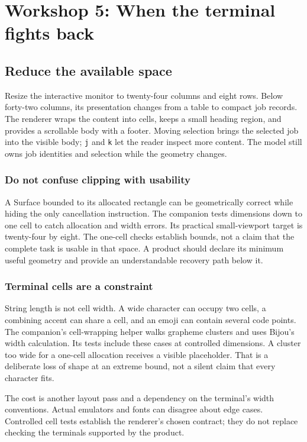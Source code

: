 \chapter{Workshop 5: When the terminal fights back}\label{workshop-05}

\section{Reduce the available space}

Resize the interactive monitor to twenty-four columns and eight rows. Below forty-two columns, its presentation changes from a table to compact job records. The renderer wraps the content into cells, keeps a small heading region, and provides a scrollable body with a footer. Moving selection brings the selected job into the visible body; \texttt{j} and \texttt{k} let the reader inspect more content. The model still owns job identities and selection while the geometry changes.

\subsection{Do not confuse clipping with usability}

A Surface bounded to its allocated rectangle can be geometrically correct while hiding the only cancellation instruction. The companion tests dimensions down to one cell to catch allocation and width errors. Its practical small-viewport target is twenty-four by eight. The one-cell checks establish bounds, not a claim that the complete task is usable in that space. A product should declare its minimum useful geometry and provide an understandable recovery path below it.

\subsection{Terminal cells are a constraint}

String length is not cell width. A wide character can occupy two cells, a combining accent can share a cell, and an emoji can contain several code points. The companion's cell-wrapping helper walks grapheme clusters and uses Bijou's width calculation. Its tests include these cases at controlled dimensions. A cluster too wide for a one-cell allocation receives a visible placeholder. That is a deliberate loss of shape at an extreme bound, not a silent claim that every character fits.

The cost is another layout pass and a dependency on the terminal's width conventions. Actual emulators and fonts can disagree about edge cases. Controlled cell tests establish the renderer's chosen contract; they do not replace checking the terminals supported by the product.

